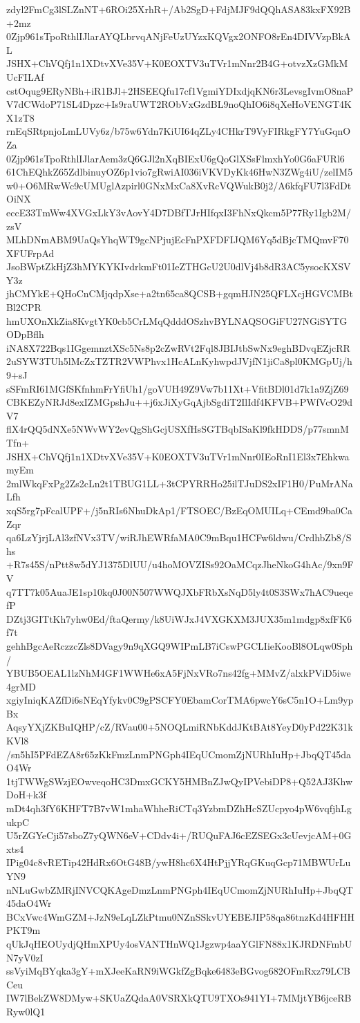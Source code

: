 zdyl2FmCg3lSLZnNT+6ROi25XrhR+/Ab2SgD+FdjMJF9dQQhASA83kxFX92B+2mz
0Zjp961sTpoRthlIJlarAYQLbrvqANjFeUzUYzxKQVgx2ONFO8rEn4DIVVzpBkAL
JSHX+ChVQfj1n1XDtvXVe35V+K0EOXTV3uTVr1mNnr2B4G+otvzXzGMkMUcFILAf
cstOqug9ERyNBh+iR1BJl+2HSEEQfu17cf1VgmiYDIxdjqKN6r3LevsgIvmO8naP
V7dCWdoP71SL4Dpzc+Is9raUWT2RObVxGzdBL9noQhIO6i8qXeHoVENGT4KX1zT8
rnEqSRtpnjoLmLUVy6z/b75w6Ydn7KiUI64qZLy4CHkrT9VyFIRkgFY7YuGqnOZa
0Zjp961sTpoRthlIJlarAem3zQ6GJl2nXqBIExU6gQoGlXSsFlmxhYo0G6aFURl6
61ChEQhkZ65ZdlbinuyOZ6p1vio7gRwiAI036iVKVDyKk46HwN3ZWg4iU/zelIM5
w0+O6MRwWc9cUMUglAzpirl0GNxMxCa8XvRcVQWukB0j2/A6kfqFU7l3FdDtOiNX
eccE33TmWw4XVGxLkY3vAovY4D7DBfTJrHIfqxI3FhNxQkcm5P77Ry1Igb2M/zsV
MLhDNmABM9UaQsYhqWT9gcNPjujEcFnPXFDFIJQM6Yq5dBjcTMQmvF70XFUFrpAd
JsoBWptZkHjZ3hMYKYKIvdrkmFt01IeZTHGcU2U0dlVj4b8dR3AC5ysocKXSVY3z
jhCMYkE+QHoCnCMjqdpXse+a2tn65ca8QCSB+gqmHJN25QFLXcjHGVCMBtBl2CPR
hmUXOnXkZia8KvgtYK0cb5CrLMqQdddOSzhvBYLNAQSOGiFU27NGiSYTGODpBflh
iNA8X722Bqs1IGgemnztXSc5Ns8p2cZwRVt2Fql8JBIJtbSwNx9eghBDvqEZjcRR
2uSYW3TUh5lMcZxTZTR2VWPhvx1HcALnKyhwpdJVjfN1jiCa8pl0KMGpUj/h9+sJ
sSFmRI61MGfSKfnhmFrYfiUh1/goVUH49Z9Vw7b11Xt+VfitBDl01d7k1a9ZjZ69
CBKEZyNRJd8exIZMGpshJu++j6xJiXyGqAjbSgdiT2IlIdf4KFVB+PWfVcO29dV7
flX4rQQ5dNXe5NWvWY2evQgShGcjUSXfHsSGTBqbISaKl9fkHDDS/p77smnMTfn+
JSHX+ChVQfj1n1XDtvXVe35V+K0EOXTV3uTVr1mNnr0IEoRnI1El3x7EhkwamyEm
2mlWkqFxPg2Zs2cLn2t1TBUG1LL+3tCPYRRHo25ilTJuDS2xIF1H0/PuMrANaLfh
xqS5rg7pFcalUPF+/j5nRIs6NhuDkAp1/FTSOEC/BzEqOMUILq+CEmd9ba0CaZqr
qa6LzYjrjLAl3zfNVx3TV/wiRJhEWRfaMA0C9mBqu1HCFw6ldwu/CrdhbZb8/Shs
+R7s45S/nPtt8w5dYJ1375DlUU/u4hoMOVZISs92OaMCqzJheNkoG4hAc/9xn9FV
q7TT7k05AuaJE1sp10kq0J00N507WWQJXbFRbXsNqD5ly4t0S3SWx7hAC9ueqefP
DZtj3GITtKh7yhw0Ed/ftaQermy/k8UiWJxJ4VXGKXM3JUX35m1mdgp8xfFK6f7t
gehhBgcAeRczzcZls8DVagy9n9qXGQ9WIPmLB7iCswPGCLIieKooBl8OLqw0Sph/
YBUB5OEAL1lzNhM4GF1WWHe6xA5FjNxVRo7ns42fg+MMvZ/alxkPViD5iwe4grMD
xgiyIniqKAZfDi6sNEqYfykv0C9gPSCFY0EbamCorTMA6pwcY6sC5n1O+Lm9ypBx
AqsyYXjZKBuIQHP/cZ/RVau00+5NOQLmiRNbKddJKtBAt8YeyD0yPd22K31kKVl8
/sn5hI5PFdEZA8r65zKkFmzLnmPNGph4IEqUCmomZjNURhIuHp+JbqQT45daO4Wr
1tjTWWgSWzjEOwveqoHC3DmxGCKY5HMBnZJwQyIPVebiDP8+Q52AJ3KhwDoH+k3f
mDt4qh3fY6KHFT7B7vW1mhaWhheRiCTq3YzbmDZhHcSZUcpyo4pW6vqfjhLgukpC
U5rZGYeCji57sboZ7yQWN6eV+CDdv4i+/RUQuFAJ6cEZSEGx3cUevjcAM+0Gxts4
IPig04c8vRETip42HdRx6OtG48B/ywH8hc6X4HtPjjYRqGKuqGcp71MBWUrLuYN9
nNLuGwbZMRjINVCQKAgeDmzLnmPNGph4IEqUCmomZjNURhIuHp+JbqQT45daO4Wr
BCxVwc4WmGZM+JzN9eLqLZkPtmu0NZnSSkvUYEBEJIP58qa86tnzKd4HFHHPKT9m
qUkJqHEOUydjQHmXPUy4osVANTHnWQ1Jgzwp4aaYGlFN88x1KJRDNFmbUN7yV0zI
ssVyiMqBYqka3gY+mXJeeKaRN9iWGkfZgBqke6483eBGvog682OFmRxz79LCBCeu
IW7lBekZW8DMyw+SKUaZQdaA0VSRXkQTU9TXOs941YI+7MMjtYB6jceRBRyw0lQ1
